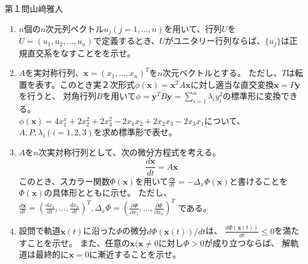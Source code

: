 \documentclass[fleqn]{jbook}
\begin{document}
\begin{question}{第１問}{山﨑雅人}
\begin{enumerate}
\item
  $n$個の$n$次元列ベクトル$u_j(j=1,\ldots, n)$を用いて、行列$U$を$U=(u_1,u_2,\ldots, u_n)$で定義するとき、$U$がユニタリー行列ならば、$\{u_j\}$は正規直交系をなすことをを示せ。

\item
  $A$を実対称行列、$\bm{x}=(x_1,\ldots,x_n)^{T}$を$n$次元ベクトルとする。
  ただし、$T$は転置を表す。このとき実２次形式$\phi(\bm{x})=\bm{x}^T A \bm{x}$に対し適当な直交変換$\bm{x}=P\bm{y}$を行うと、
  対角行列$B$を用いて$\phi=\bm{y}^T B \bm{y}=\sum_{i=1}^n \lambda_i y_i^2$の標準形に変換できる。\\
  $\phi(\bm{x})=4 x_1^x+2 x_2^2+2 x_3^2-2 x_1 x_2+2 x_2 x_3-2 x_3 x_1$について、
  $A,P,\lambda_i (i=1,2,3)$を求め標準形で表せ。

\item{}
  $A$を$n$次実対称行列として、次の微分方程式を考える。
  $$\frac{d\bm{x}}{dt}=A\bm{x}$$
  このとき、スカラー関数$\Phi(\bm{x})$を用いて$\frac{d\bm{x}}{dt}=-\Delta_x \Phi(\bm{x})$と書けることを$\Phi(\bm{x})$の具体形とともに示せ。
  ただし、$\frac{d\bm{x}}{dt}=(\frac{dx_1}{dt},\ldots,\frac{dx_n}{dt})^T, \Delta_x \Phi=(\frac{\partial \Phi}{\partial x_1},\ldots,\frac{\partial \Phi}{\partial x_n})^T$
  である。

\item
  設問で軌道$\bm{x}(t)$に沿った$\Phi$の微分$d\Phi(\bm{x}(t))/dt$は、
  $\frac{d\Phi(\bm{x}(t))}{dt}\le 0$を満たすことを示せ。
  また、任意の$\bm{x} (\bm{x}\ne 0$に対し$\Phi >0$が成り立つならば、
  解軌道は最終的に$\bm{x}=0$に漸近することを示せ。
\end{enumerate}
\end{question}
\end{document}
